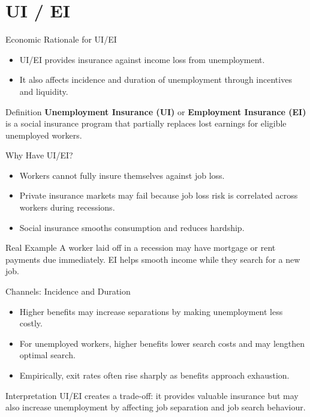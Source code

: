\documentclass[aspectratio=169]{beamer}
\begin{document}
\section{UI / EI}

\begin{frame}{Economic Rationale for UI/EI}
\transfade
\begin{itemize}[<+->]
  \item UI/EI provides insurance against income loss from unemployment.
  \item It also affects incidence and duration of unemployment through incentives and liquidity.
\end{itemize}

\begin{block}{Definition}
\textbf{Unemployment Insurance (UI)} or \textbf{Employment Insurance (EI)} is a social insurance program that partially replaces lost earnings for eligible unemployed workers.
\end{block}
\end{frame}

\begin{frame}{Why Have UI/EI?}
\transfade
\begin{itemize}[<+->]
  \item Workers cannot fully insure themselves against job loss.
  \item Private insurance markets may fail because job loss risk is correlated across workers during recessions.
  \item Social insurance smooths consumption and reduces hardship.
\end{itemize}

\begin{exampleblock}{Real Example}
A worker laid off in a recession may have mortgage or rent payments due immediately. EI helps smooth income while they search for a new job.
\end{exampleblock}
\end{frame}

\begin{frame}{Channels: Incidence and Duration}
\transfade
\begin{itemize}[<+->]
  \item Higher benefits may increase separations by making unemployment less costly.
  \item For unemployed workers, higher benefits lower search costs and may lengthen optimal search.
  \item Empirically, exit rates often rise sharply as benefits approach exhaustion.
\end{itemize}

\begin{block}{Interpretation}
UI/EI creates a trade-off: it provides valuable insurance but may also increase unemployment by affecting job separation and job search behaviour.
\end{block}
\end{frame}
\end{document}
